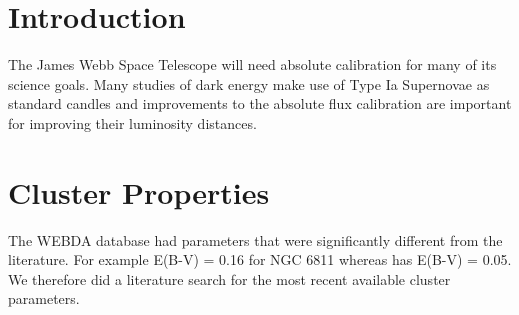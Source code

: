 \documentclass{aastex6}
\begin{document}




\section{Introduction}

The James Webb Space Telescope \citep[JWST; e.g.][]{gardner2006SSRv} will need absolute calibration for many of its science goals.
Many studies of dark energy make use of Type Ia Supernovae as standard candles and improvements to the absolute flux calibration are important for improving their luminosity distances.

\section{Cluster Properties}

The WEBDA database had parameters that were significantly different from the literature.
For example E(B-V) = 0.16 for NGC 6811 whereas \citet{molendaz2016spec6811} has E(B-V) = 0.05.
We therefore did a literature search for the most recent available cluster parameters.
\end{document}
